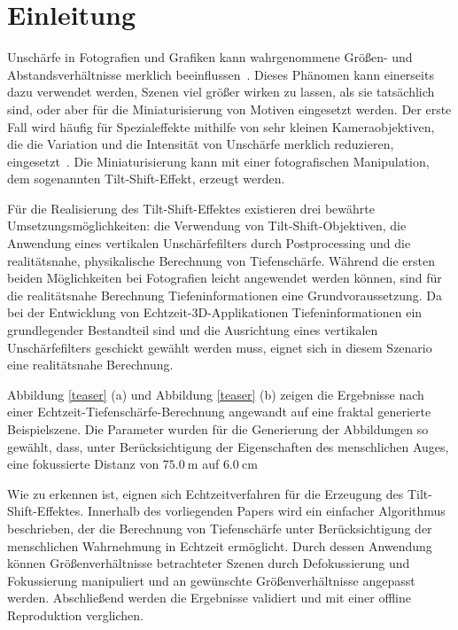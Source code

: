 \documentclass{acmsiggraph}                     %
\begin{document}
\keywordlist

\section{Einleitung}

\copyrightspace

Unschärfe in Fotografien und Grafiken kann wahrgenommene Größen- und Abstandsverhältnisse merklich beeinflussen~\cite{Held:2010cr}. Dieses Phänomen kann einerseits dazu verwendet werden, Szenen viel größer wirken zu lassen, als sie tatsächlich sind, oder aber für die Miniaturisierung von Motiven eingesetzt werden. Der erste Fall wird häufig für Spezialeffekte mithilfe von sehr kleinen Kameraobjektiven, die die Variation und die Intensität von Unschärfe merklich reduzieren, eingesetzt~\cite{Held:2010cr}. Die Miniaturisierung kann mit einer fotografischen Manipulation, dem sogenannten Tilt-Shift-Effekt, erzeugt werden.

Für die Realisierung des Tilt-Shift-Effektes existieren drei bewährte Umsetzungsmöglichkeiten: die Verwendung von Tilt-Shift-Objektiven, die Anwendung eines vertikalen Unschärfefilters durch Postprocessing und die realitätsnahe, physikalische Berechnung von Tiefenschärfe. Während die ersten beiden Möglichkeiten bei Fotografien leicht angewendet werden können, sind für die realitätsnahe Berechnung Tiefeninformationen eine Grundvoraussetzung. Da bei der Entwicklung von Echtzeit-3D-Applikationen Tiefeninformationen ein grundlegender Bestandteil sind und die Ausrichtung eines vertikalen Unschärfefilters geschickt gewählt werden muss, eignet sich in diesem Szenario eine realitätsnahe Berechnung.

Abbildung \ref{teaser} (a) und Abbildung \ref{teaser} (b) zeigen die Ergebnisse nach einer Echtzeit-Tiefenschärfe-Berechnung angewandt auf eine fraktal generierte Beispielszene. Die Parameter wurden für die Generierung der Abbildungen so gewählt, dass, unter Berücksichtigung der Eigenschaften des menschlichen Auges, eine fokussierte Distanz von $\SI{75.0}{\meter}$ auf  $\SI{6.0}{\centi\meter}$

Wie zu erkennen ist, eignen sich Echtzeitverfahren für die Erzeugung des Tilt-Shift-Effektes. Innerhalb des vorliegenden Papers wird ein einfacher Algorithmus beschrieben, der die Berechnung von Tiefenschärfe unter Berücksichtigung der menschlichen Wahrnehmung in Echtzeit ermöglicht. Durch dessen Anwendung können Größenverhältnisse betrachteter Szenen durch Defokussierung und Fokussierung manipuliert und an gewünschte Größenverhältnisse angepasst werden. Abschließend werden die Ergebnisse validiert und mit einer offline Reproduktion verglichen.
\end{document}
